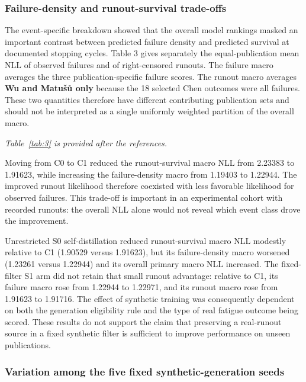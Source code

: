 \documentclass[12pt,a4paper]{article}
\begin{document}
\subsubsection{Failure-density and runout-survival trade-offs}

The event-specific breakdown showed that the overall model rankings masked an important contrast between predicted failure density and predicted survival at documented stopping cycles. Table 3 gives separately the equal-publication mean NLL of observed failures and of right-censored runouts. The failure macro averages the three publication-specific failure scores. The runout macro averages \textbf{Wu and Matušů only} because the 18 selected Chen outcomes were all failures. These two quantities therefore have different contributing publication sets and should not be interpreted as a single uniformly weighted partition of the overall macro.

\noindent\textit{Table~\ref{tab:3} is provided after the references.}\par

Moving from C0 to C1 reduced the runout-survival macro NLL from 2.23383 to 1.91623, while increasing the failure-density macro from 1.19403 to 1.22944. The improved runout likelihood therefore coexisted with less favorable likelihood for observed failures. This trade-off is important in an experimental cohort with recorded runouts: the overall NLL alone would not reveal which event class drove the improvement.

Unrestricted S0 self-distillation reduced runout-survival macro NLL modestly relative to C1 (1.90529 versus 1.91623), but its failure-density macro worsened (1.23261 versus 1.22944) and its overall primary macro NLL increased. The fixed-filter S1 arm did not retain that small runout advantage: relative to C1, its failure macro rose from 1.22944 to 1.22971, and its runout macro rose from 1.91623 to 1.91716. The effect of synthetic training was consequently dependent on both the generation eligibility rule and the type of real fatigue outcome being scored. These results do not support the claim that preserving a real-runout source in a fixed synthetic filter is sufficient to improve performance on unseen publications.

\subsubsection{Variation among the five fixed synthetic-generation seeds}
\end{document}
